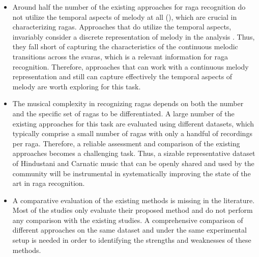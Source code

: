 \begin{itemize}
	\item Around half the number of the existing approaches for \gls{raga} recognition do not utilize the temporal aspects of melody at all (), which are crucial in characterizing \glspl{raga}. Approaches that do utilize the temporal aspects, invariably consider a discrete representation of melody in the analysis . Thus, they fall short of capturing the characteristics of the continuous melodic transitions across the \glspl{svara}, which is a relevant information for \gls{raga} recognition. Therefore, approaches that can work with a continuous melody representation and still can capture effectively the temporal aspects of melody are worth exploring for this task.
	
	\item The musical complexity in recognizing \glspl{raga} depends on both the number and the specific set of \glspl{raga} to be differentiated. A large number of the existing approaches for this task are evaluated using different datasets, which typically comprise a small number of \glspl{raga} with only a handful of recordings per \gls{raga}. Therefore, a reliable assessment and comparison of the existing approaches becomes a challenging task. Thus, a sizable representative dataset of Hindustani and Carnatic music that can be openly shared and used by the community will be instrumental in systematically improving the state of the art in \gls{raga} recognition.
	
	\item A comparative  evaluation of the existing methods is missing in the literature. Most of the studies only evaluate their proposed method and do not perform any comparison with the existing studies. A comprehensive comparison of different approaches on the same dataset and under the same experimental setup is needed in order to identifying the strengths and weaknesses of these methods.
	
\end{itemize}


